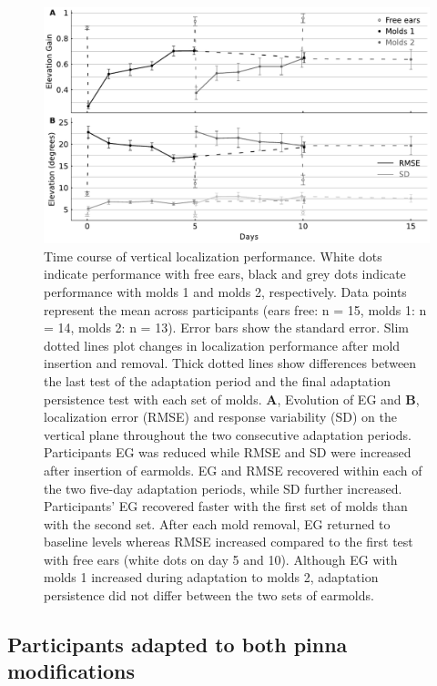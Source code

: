  \begin{figure}[ht]
	\includegraphics[width=18cm, center]{../Results/figures/fig5/fig5}
	\caption{Time course of vertical localization performance. White dots indicate performance with free ears, black and grey dots indicate performance with molds 1 and molds 2, respectively. Data points represent the mean across participants (ears free: n = 15, molds 1: n = 14, molds 2: n = 13). Error bars show the standard error. Slim dotted lines plot changes in localization performance after mold insertion and removal. Thick dotted lines show differences between the last test of the adaptation period and the final adaptation persistence test with each set of molds. \textbf{A}, Evolution of EG and \textbf{B}, localization error (RMSE) and response variability (SD) on the vertical plane throughout the two consecutive adaptation periods. Participants EG was reduced while RMSE and SD were increased after insertion of earmolds. EG and RMSE recovered within each of the two five-day adaptation periods, while SD further increased. Participants' EG recovered faster with the first set of molds than with the second set. After each mold removal, EG returned to baseline levels whereas RMSE increased compared to the first test with free ears (white dots on day 5 and 10). Although EG with molds 1 increased during adaptation to molds 2, adaptation persistence did not differ between the two sets of earmolds.}
        \label{fig:adaptation}
\end{figure}

 
\subsection{Participants adapted to both pinna modifications}
 
